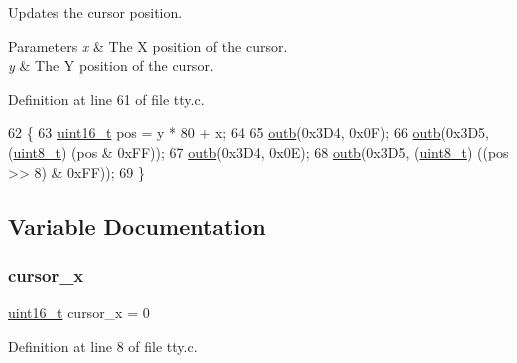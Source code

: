 Updates the cursor position. 


\begin{DoxyParams}{Parameters}
{\em x} & The X position of the cursor. \\
\hline
{\em y} & The Y position of the cursor. \\
\hline
\end{DoxyParams}


Definition at line 61 of file tty.\+c.


\begin{DoxyCode}
62 \{
63     \hyperlink{a00140_a273cf69d639a59973b6019625df33e30_a273cf69d639a59973b6019625df33e30}{uint16\_t} pos = y * 80 + x;
64  
65     \hyperlink{a00164_aa37f5841c54156a4b14fc0d6f626b44f_aa37f5841c54156a4b14fc0d6f626b44f}{outb}(0x3D4, 0x0F);
66     \hyperlink{a00164_aa37f5841c54156a4b14fc0d6f626b44f_aa37f5841c54156a4b14fc0d6f626b44f}{outb}(0x3D5, (\hyperlink{a00140_aba7bc1797add20fe3efdf37ced1182c5_aba7bc1797add20fe3efdf37ced1182c5}{uint8\_t}) (pos & 0xFF));
67     \hyperlink{a00164_aa37f5841c54156a4b14fc0d6f626b44f_aa37f5841c54156a4b14fc0d6f626b44f}{outb}(0x3D4, 0x0E);
68     \hyperlink{a00164_aa37f5841c54156a4b14fc0d6f626b44f_aa37f5841c54156a4b14fc0d6f626b44f}{outb}(0x3D5, (\hyperlink{a00140_aba7bc1797add20fe3efdf37ced1182c5_aba7bc1797add20fe3efdf37ced1182c5}{uint8\_t}) ((pos >> 8) & 0xFF));
69 \}
\end{DoxyCode}


\subsection{Variable Documentation}
\mbox{\label{a00179_ae69604af0f9bd5fca2a016d0aa1ba7e1_ae69604af0f9bd5fca2a016d0aa1ba7e1}} 
\subsubsection{\texorpdfstring{cursor\+\_\+x}{cursor\_x}}
{\footnotesize\ttfamily \hyperlink{a00140_a273cf69d639a59973b6019625df33e30_a273cf69d639a59973b6019625df33e30}{uint16\+\_\+t} cursor\+\_\+x = 0}



Definition at line 8 of file tty.\+c.

\mbox{\label{a00179_a0301c5492919c401c2c1ecf52af709b0_a0301c5492919c401c2c1ecf52af709b0}} 
